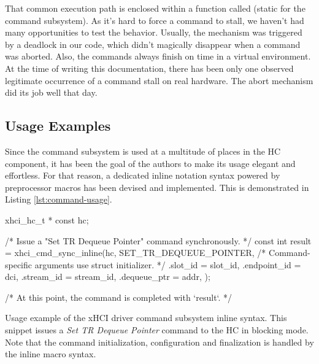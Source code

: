 That common execution path is enclosed within a function called
 (static for the command subsystem). As it's hard
to force a command to stall, we haven't had many opportunities to test the
behavior. Usually, the mechanism was triggered by a deadlock in our code, which
didn't magically disappear when a command was aborted. Also, the commands
always finish on time in a virtual environment. At the time of writing this
documentation, there has been only one observed legitimate occurrence of
a command stall on real hardware. The abort mechanism did its job well that day.

\subsection{Usage Examples}

Since the command subsystem is used at a multitude of places in the HC
component, it has been the goal of the authors to make its usage elegant and
effortless. For that reason, a dedicated inline notation syntax powered by
preprocessor macros has been devised and implemented. This is demonstrated in
Listing \ref{lst:command-usage}.

\begin{listing}[h]
	\begin{code}
		xhci_hc_t * const hc;

		/* Issue a "Set TR Dequeue Pointer" command synchronously. */
		const int result = xhci_cmd_sync_inline(hc, SET_TR_DEQUEUE_POINTER,
		    /* Command-specific arguments use struct initializer. */
		    .slot_id = slot_id,
		    .endpoint_id = dci,
		    .stream_id = stream_id,
		    .dequeue_ptr = addr,
		);

		/* At this point, the command is completed with `result`. */
	\end{code}
	\caption[Usage example of xHCI driver inline command syntax.]{Usage example
	of the xHCI driver command subsystem inline  syntax. This snippet issues a
	\textit{Set TR Dequeue Pointer} command to the HC in blocking mode. Note
	that the command initialization, configuration and finalization is handled
	by the inline macro syntax.}
	\label{lst:command-usage}
\end{listing}

